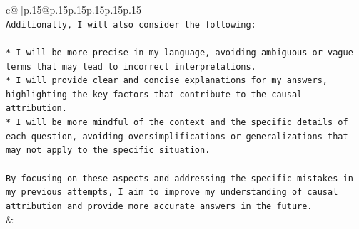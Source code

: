 \documentclass{article}
\begin{document}
{\begin{supertabular}{c@{$\;$}|p{.15\linewidth}@{}p{.15\linewidth}p{.15\linewidth}p{.15\linewidth}p{.15\linewidth}p{.15\linewidth}}
{{{\\ 
\texttt{Additionally, I will also consider the following:} \\
\\ 
\texttt{* I will be more precise in my language, avoiding ambiguous or vague terms that may lead to incorrect interpretations.} \\
\texttt{* I will provide clear and concise explanations for my answers, highlighting the key factors that contribute to the causal attribution.} \\
\texttt{* I will be more mindful of the context and the specific details of each question, avoiding oversimplifications or generalizations that may not apply to the specific situation.} \\
\\ 
\texttt{By focusing on these aspects and addressing the specific mistakes in my previous attempts, I aim to improve my understanding of causal attribution and provide more accurate answers in the future.} \\
            }
        }
    }
    & \\ \\

\end{supertabular}
}
\end{document}
